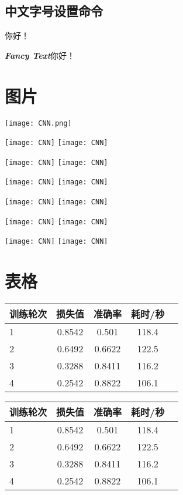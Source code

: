 \documentclass[12pt]{article} %
\newcommand{\myfont}{\textit{\textbf{\textsf{Fancy Text}}}}
\begin{document}
	\subsection{中文字号设置命令}
	 你好！
	
	{\myfont 你好！}
	
	\section{图片}
	\texttt{[image: CNN.png]}
	
	\texttt{[image: CNN]}
	\texttt{[image: CNN]}
	
	\texttt{[image: CNN]}
	\texttt{[image: CNN]}
	
	\texttt{[image: CNN]}
	\texttt{[image: CNN]}
	
	\texttt{[image: CNN]}
	\texttt{[image: CNN]}
	
	\texttt{[image: CNN]}
	\texttt{[image: CNN]}
	
	\texttt{[image: CNN]}
	\texttt{[image: CNN]}
	
	\section{表格}
	
	\begin{tabular}{l c c c r}
		\hline
		训练轮次 & 损失值 & 准确率 & 耗时/秒 \\
		\hline
		1 & 0.8542 & 0.501 & 118.4  \\
		2 & 0.6492 & 0.6622 & 122.5 \\
		3 & 0.3288 & 0.8411 & 116.2 \\
		4 & 0.2542 & 0.8822 & 106.1 \\
		\hline
	\end{tabular}


	\begin{tabular}{|l|c|c|c|r}
		\hline
		训练轮次 & 损失值 & 准确率 & 耗时/秒 \\
		\hline
		1 & 0.8542 & 0.501 & 118.4  \\
		2 & 0.6492 & 0.6622 & 122.5 \\
		3 & 0.3288 & 0.8411 & 116.2 \\
		4 & 0.2542 & 0.8822 & 106.1 \\
		\hline
	\end{tabular}
\end{document}
